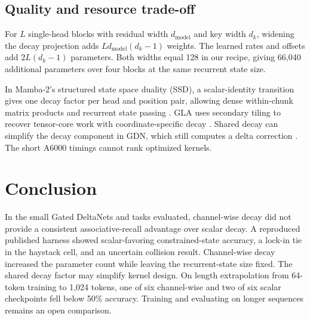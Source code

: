 \documentclass[conference]{IEEEtran}
\begin{document}
\subsection{Quality and resource trade-off}
For $L$ single-head blocks with residual width $d_{\mathrm{model}}$ and key width $d_k$, widening the decay projection adds $L d_{\mathrm{model}}(d_k-1)$ weights. The learned rates and offsets add $2L(d_k-1)$ parameters. Both widths equal 128 in our recipe, giving 66,040 additional parameters over four blocks at the same recurrent state size.

In Mamba-2's structured state space duality (SSD), a scalar-identity transition gives one decay factor per head and position pair, allowing dense within-chunk matrix products and recurrent state passing \cite{dao2024transformers}. GLA uses secondary tiling to recover tensor-core work with coordinate-specific decay \cite{yang2024gla}. Shared decay can simplify the decay component in GDN, which still computes a delta correction \cite{yang2025gdn,yang2024delta}. The short A6000 timings cannot rank optimized kernels.

\section{Conclusion}
In the small Gated DeltaNets and tasks evaluated, channel-wise decay did not provide a consistent associative-recall advantage over scalar decay. A reproduced published harness showed scalar-favoring constrained-state accuracy, a lock-in tie in the haystack cell, and an uncertain collision result. Channel-wise decay increased the parameter count while leaving the recurrent-state size fixed. The shared decay factor may simplify kernel design. On length extrapolation from 64-token training to 1,024 tokens, one of six channel-wise and two of six scalar checkpoints fell below 50\% accuracy. Training and evaluating on longer sequences remains an open comparison.



\end{document}

